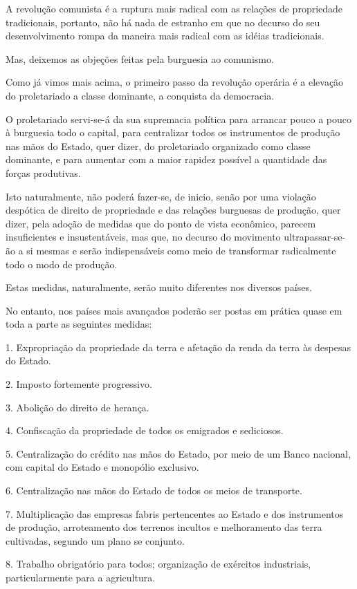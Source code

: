 A revolução comunista é a ruptura mais radical com as relações de
propriedade tradicionais, portanto, não há nada de estranho em que no
decurso do seu desenvolvimento rompa da maneira mais radical com as
idéias tradicionais.

Mas, deixemos as objeções feitas pela burguesia ao comunismo.

Como já vimos mais acima, o primeiro passo da revolução operária é a
elevação do proletariado a classe dominante, a conquista da
democracia.

O proletariado servi-se-á da sua supremacia política para arrancar
pouco a pouco à burguesia todo o capital, para centralizar todos os
instrumentos de produção nas mãos do Estado, quer dizer, do
proletariado organizado como classe dominante, e para aumentar com a
maior rapidez possível a quantidade das forças produtivas.

Isto naturalmente, não poderá fazer-se, de inicio, senão por uma
violação despótica de direito de propriedade e das relações burguesas
de produção, quer dizer, pela adoção de medidas que do ponto de vista
econômico, parecem insuficientes e insustentáveis, mas que, no decurso
do movimento ultrapassar-se-ão a si mesmas e serão indispensáveis
como meio de transformar radicalmente todo o modo de produção.

Estas medidas, naturalmente, serão muito diferentes nos diversos
países.

No entanto, nos países mais avançados poderão ser postas em prática
quase em toda a parte as seguintes medidas:

1. Expropriação da propriedade da terra e afetação da renda da terra
às despesas do Estado.

2. Imposto fortemente progressivo.

3. Abolição do direito de herança.

4. Confiscação da propriedade de todos os emigrados e sediciosos.

5. Centralização do crédito nas mãos do Estado, por meio de um Banco
nacional, com capital do Estado e monopólio exclusivo.

6. Centralização nas mãos do Estado de todos os meios de transporte.

7. Multiplicação das empresas fabris pertencentes ao Estado e dos
instrumentos de produção, arroteamento dos terrenos incultos e
melhoramento das terra cultivadas, segundo um plano se conjunto.

8. Trabalho obrigatório para todos; organização de exércitos
industriais, particularmente para a agricultura.

